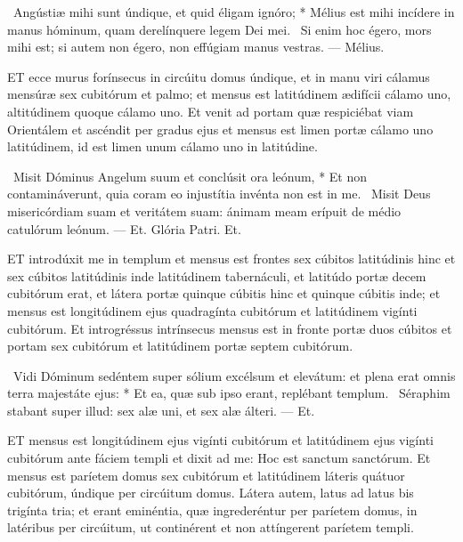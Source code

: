 \R\ Angústiæ mihi sunt úndique, et quid éligam ignóro; * Mélius est mihi incídere in manus hóminum, quam derelínquere legem Dei mei. \V\ Si enim hoc égero, mors mihi est; si autem non égero, non effúgiam manus vestras. — Mélius.



\lettrine[lines=2]{E}{T} ecce murus forínsecus in circúitu domus úndique, et in manu viri cálamus mensúræ sex cubitórum et palmo; et mensus est latitúdinem ædifícii cálamo uno, altitúdinem quoque cálamo uno. Et venit ad portam quæ respiciébat viam Orientálem et ascéndit per gradus ejus et mensus est limen portæ cálamo uno latitúdinem, id est limen unum cálamo uno in latitúdine.

\R\ Misit Dóminus Angelum suum et conclúsit ora leónum, * Et non contamináverunt, quia coram eo injustítia invénta non est in me. \V\ Misit Deus misericórdiam suam et veritátem suam: ánimam meam erípuit de médio catulórum leónum. — Et. Glória Patri. Et.




\lettrine[lines=2]{E}{T} introdúxit me in templum et mensus est frontes sex cúbitos latitúdinis hinc et sex cúbitos latitúdinis inde latitúdinem tabernáculi, et latitúdo portæ decem cubitórum erat, et látera portæ quinque cúbitis hinc et quinque cúbitis inde; et mensus est longitúdinem ejus quadragínta cubitórum et latitúdinem vigínti cubitórum. Et introgréssus intrínsecus mensus est in fronte portæ duos cúbitos et portam sex cubitórum et latitúdinem portæ septem cubitórum.

\R\ Vidi Dóminum sedéntem super sólium excélsum et elevátum: et plena erat omnis terra majestáte ejus: * Et ea, quæ sub ipso erant, replébant templum. \V\ Séraphim stabant super illud: sex alæ uni, et sex alæ álteri. — Et.


\lettrine[lines=2]{E}{T} mensus est longitúdinem ejus vigínti cubitórum et latitúdinem ejus vigínti cubitórum ante fáciem templi et dixit ad me: Hoc est sanctum sanctórum. Et mensus est paríetem domus sex cubitórum et latitúdinem láteris quátuor cubitórum, úndique per circúitum domus. Látera autem, latus ad latus bis trigínta tria; et erant eminéntia, quæ ingrederéntur per paríetem domus, in latéribus per circúitum, ut continérent et non attíngerent paríetem templi.

